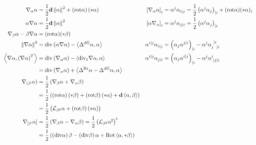 \documentclass[a4paper,7pt]{scrartcl}
\newcommand{\exd}{\mathbf{d}}
\newcommand{\rot}{\mathrm{rot}}
\renewcommand{\div}{\mathrm{div}}
\newcommand{\Rot}{\mathrm{Rot}}
\newcommand{\lie}{\mathcal{L}}
\newcommand{\laplace}[1]{\Delta^{#1}}
\newcommand{\ldivgrad}{\laplace{\textup{dG}}}
\newcommand{\lrotrot}{\laplace{\textup{Rr}}}
\begin{document}
  \begin{align*}
    \nabla_{\alpha}\alpha &= \frac{1}{2}\exd\left\| \alpha \right\|^{2} + \left( \rot\alpha \right)\left( *\alpha \right)
                &\left[ \nabla_{\alpha}\alpha \right]_{i} 
                    &= \alpha^{j}\alpha_{i|j}
                      = \frac{1}{2}\left( \alpha^{j}\alpha_{j} \right)_{|i} + (\rot\alpha)(*\alpha)_{i} \\
    \alpha\nabla\alpha &= \frac{1}{2}\exd\left\| \alpha \right\|^{2}
                &\left[ \alpha\nabla_{\alpha} \right]_{i} &= \alpha^{j}\alpha_{j|i}
                          = \frac{1}{2}\left( \alpha^{j}\alpha_{j} \right)_{|i}\\
    \nabla_{\beta}\alpha-\beta\nabla\alpha &= (\rot\alpha)(*\beta)\\
    \left\| \nabla\alpha \right\|^{2} &= \div\left( \alpha\nabla\alpha \right) - \left\langle \ldivgrad\alpha , \alpha \right\rangle
            &\alpha^{i|j}\alpha_{i|j} &= \left( \alpha_{j}\alpha^{j|i} \right)_{|i} - \alpha^{j}\tensor{\alpha}{_{j}^{|i}_{|i}}\\
    \left\langle \nabla\alpha,\left( \nabla\alpha \right)^{T} \right\rangle 
        &= \div\left( \nabla_{\alpha}\alpha \right) - \left\langle \div_{1}\nabla\alpha, \alpha \right\rangle
            &\alpha^{i|j}\alpha_{j|i} &= \left( \alpha_{j}\alpha^{i|j} \right)_{|i} - \alpha^{j}\tensor{\alpha}{^{i}_{|j|i}}\\
        &= \div\left( \nabla_{\alpha}\alpha \right) + \left\langle \lrotrot\alpha - \ldivgrad\alpha , \alpha \right\rangle\\
    \nabla_{\left( \beta \!\right.}\!\left. \alpha \right)
        &= \frac{1}{2}\left( \nabla_{\beta}\alpha + \nabla_{\alpha}\beta \right)\\
        &= \frac{1}{2}\left( \left( \rot\alpha \right)\left( *\beta \right) + \left( \rot\beta \right)\left( *\alpha \right) + \exd\left\langle \alpha, \beta \right\rangle \right)\\
        &= \frac{1}{2}\left( \lie_{\beta^{\sharp}}\alpha + \left( \rot\beta \right)\left( *\alpha \right) \right)\\
    \nabla_{\left[ \beta \!\right.}\!\left. \alpha \right]
        &= \frac{1}{2}\left( \nabla_{\beta}\alpha - \nabla_{\alpha}\beta \right)
         = \frac{1}{2}\left( \lie_{\beta^{\sharp}}\alpha^{\sharp} \right)^{\flat} \\
        &= \frac{1}{2}\left( \left( \div\alpha \right)\beta - \left( \div\beta \right)\alpha + \Rot\left\langle \alpha , *\beta \right\rangle \right)\\

\end{align*}
\end{document}
